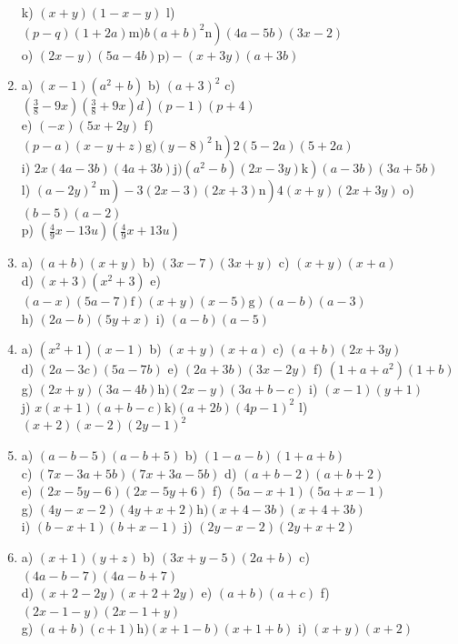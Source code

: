\documentclass[10pt]{article}
\begin{document}
\begin{enumerate}
k) \((x+y)(1-x-y)\) l) \(\left.(p-q)(1+2 a) \mathrm{m}) b(a+b)^{2} \mathrm{n}\right)(4 a-5 b)(3 x-2)\)\\
o) \((2 x-y)(5 a-4 b) \mathrm{p})-(x+3 y)(a+3 b)\)
  \item a) \((x-1)\left(a^{2}+b\right)\) b) \((a+3)^{2}\) c) \(\left.\left(\frac{3}{8}-9 x\right)\left(\frac{3}{8}+9 x\right) d\right)(p-1)(p+4)\)\\
e) \((-x)(5 x+2 y)\) f) \(\left.(p-a)(x-y+z) \mathrm{g})(y-8)^{2} \mathrm{~h}\right) 2(5-2 a)(5+2 a)\)\\
i) \(\left.2 x(4 a-3 b)(4 a+3 b) \mathrm{j})\left(a^{2}-b\right)(2 x-3 y) \mathrm{k}\right)(a-3 b)(3 a+5 b)\)\\
l) \(\left.\left.(a-2 y)^{2} \mathrm{~m}\right)-3(2 x-3)(2 x+3) \mathrm{n}\right) 4(x+y)(2 x+3 y)\) o) \((b-5)(a-2)\)\\
p) \(\left(\frac{4}{9} x-13 u\right)\left(\frac{4}{9} x+13 u\right)\)
  \item a) \((a+b)(x+y)\) b) \((3 x-7)(3 x+y)\) c) \((x+y)(x+a)\)\\
d) \((x+3)\left(x^{2}+3\right)\) e) \(\left.\left.(a-x)(5 a-7) \mathrm{f}\right)(x+y)(x-5) \mathrm{g}\right)(a-b)(a-3)\)\\
h) \((2 a-b)(5 y+x)\) i) \((a-b)(a-5)\)
  \item a) \(\left(x^{2}+1\right)(x-1)\) b) \((x+y)(x+a)\) c) \((a+b)(2 x+3 y)\)\\
d) \((2 a-3 c)(5 a-7 b)\) e) \((2 a+3 b)(3 x-2 y)\) f) \(\left(1+a+a^{2}\right)(1+b)\)\\
g) \((2 x+y)(3 a-4 b) \mathrm{h})(2 x-y)(3 a+b-c)\) i) \((x-1)(y+1)\)\\
j) \(x(x+1)(a+b-c) \mathrm{k})(a+2 b)(4 p-1)^{2}\) l) \((x+2)(x-2)(2 y-1)^{2}\)
  \item a) \((a-b-5)(a-b+5)\) b) \((1-a-b)(1+a+b)\)\\
c) \((7 x-3 a+5 b)(7 x+3 a-5 b)\) d) \((a+b-2)(a+b+2)\)\\
e) \((2 x-5 y-6)(2 x-5 y+6)\) f) \((5 a-x+1)(5 a+x-1)\)\\
g) \((4 y-x-2)(4 y+x+2) \mathrm{h})(x+4-3 b)(x+4+3 b)\)\\
i) \((b-x+1)(b+x-1)\) j) \((2 y-x-2)(2 y+x+2)\)
  \item a) \((x+1)(y+z)\) b) \((3 x+y-5)(2 a+b)\) c) \((4 a-b-7)(4 a-b+7)\)\\
d) \((x+2-2 y)(x+2+2 y)\) e) \((a+b)(a+c)\) f) \((2 x-1-y)(2 x-1+y)\)\\
g) \((a+b)(c+1) \mathrm{h})(x+1-b)(x+1+b)\) i) \((x+y)(x+2)\)\\

\end{enumerate}
\end{document}
